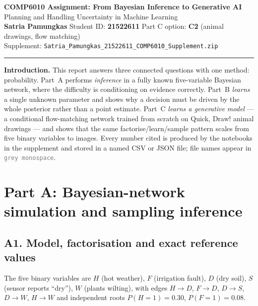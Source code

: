 \documentclass[10pt,a4paper]{article}
\begin{document}
\pagestyle{plain}

\begin{center}
{\Large\bfseries COMP6010 Assignment: From Bayesian Inference to Generative AI}\\[2pt]
{\normalsize Planning and Handling Uncertainty in Machine Learning}\\[3pt]
{\bfseries Satria Pamungkas} \quad\textbullet\quad Student ID: {\bfseries 21522611}
\quad\textbullet\quad Part C option: {\bfseries C2} (animal drawings, flow matching)\\[2pt]
{\small Supplement: \texttt{Satria\_Pamungkas\_21522611\_COMP6010\_Supplement.zip}}
\end{center}
\vspace{-4pt}
\hrule
\vspace{3pt}

\noindent\textbf{Introduction.}
This report answers three connected questions with one method: probability. Part~A performs
\emph{inference} in a fully known five-variable Bayesian network, where the difficulty is
conditioning on evidence correctly. Part~B \emph{learns} a single unknown parameter and shows why a
decision must be driven by the whole posterior rather than a point estimate. Part~C \emph{learns a
generative model} --- a conditional flow-matching network trained from scratch on Quick, Draw!
animal drawings --- and shows that the same factorise/learn/sample pattern scales from five binary
variables to images. Every number cited is produced by the notebooks in the supplement and stored in
a named CSV or JSON file; file names appear in \textcolor{gray}{\small\texttt{grey monospace}}.

\section{Part A: Bayesian-network simulation and sampling inference}

\subsection{A1. Model, factorisation and exact reference values}

The five binary variables are $H$ (hot weather), $F$ (irrigation fault), $D$ (dry soil), $S$ (sensor
reports ``dry''), $W$ (plants wilting), with edges $H\!\to\!D$, $F\!\to\!D$, $D\!\to\!S$,
$D\!\to\!W$, $H\!\to\!W$ and independent roots $P(H{=}1)=0.30$, $P(F{=}1)=0.08$.
\end{document}
